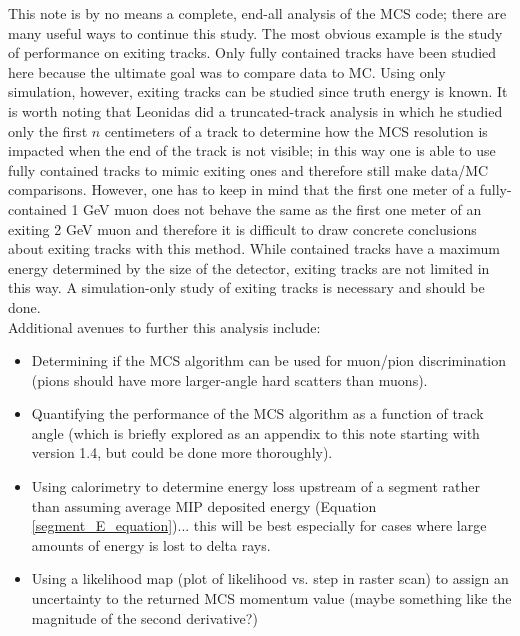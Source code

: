 This note is by no means a complete, end-all analysis of the MCS code; there are many useful ways to continue this study. The most obvious example is the study of performance on exiting tracks. Only fully contained tracks have been studied here because the ultimate goal was to compare data to MC. Using only simulation, however, exiting tracks can be studied since truth energy is known. It is worth noting that Leonidas did a truncated-track analysis\cite{leonidas1} in which he studied only the first $n$ centimeters of a track to determine how the MCS resolution is impacted when the end of the track is not visible; in this way one is able to use fully contained tracks to mimic exiting ones and therefore still make data/MC comparisons. However, one has to keep in mind that the first one meter of a fully-contained 1 GeV muon does not behave the same as the first one meter of an exiting 2 GeV muon and therefore it is difficult to draw concrete conclusions about exiting tracks with this method. While contained tracks have a maximum energy determined by the size of the detector, exiting tracks are not limited in this way. A simulation-only study of exiting tracks is necessary and should be done.\\

Additional avenues to further this analysis include:
\begin{itemize}
	\item Determining if the MCS algorithm can be used for muon/pion discrimination (pions should have more larger-angle hard scatters than muons).
	\item Quantifying the performance of the MCS algorithm as a function of track angle (which is briefly explored as an appendix to this note starting with version 1.4, but could be done more thoroughly).
	\item Using calorimetry to determine energy loss upstream of a segment rather than assuming average MIP deposited energy (Equation \ref{segment_E_equation})... this will be best especially for cases where large amounts of energy is lost to delta rays.
	\item Using a likelihood map (plot of likelihood vs. step in raster scan) to assign an uncertainty to the returned MCS momentum value (maybe something like the magnitude of the second derivative?)

\end{itemize}


